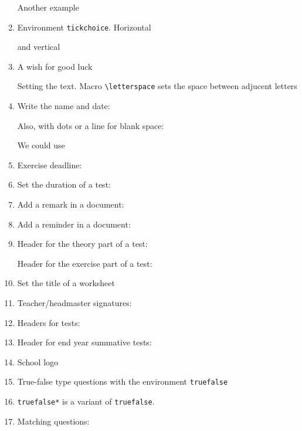 \documentclass[10pt,a4page]{article}
\def\cellwidth{0.4\textwidth}
\newcommand{\miniexample}[2][c]{%
  \parbox[#1]{\cellwidth}{#2}
}
\newcommand{\codeexample}[2][c]{%
  \miniexample[#1]{}
}
\newcommand{\textexample}[2][c]{%
  \small
  \colorbox[gray]{0.9}{\miniexample[#1]{}}
}
\newcommand{\examplerow}[2][10pt]{%
  \par\noindent\phantom{}\hfill\codeexample{#2}\hspace{#1}\textexample{#2}\hfill\phantom{}
}
\begin{document}
\begin{enumerate}
  Another example
  \examplerow{exampleEnvirMultichoice02.tex}
\item Environment \texttt{tickchoice}. Horizontal
  \examplerow{exampleEnvirTickchoice01.tex}

  and vertical

  \examplerow{exampleEnvirTickchoice02.tex}
\item A wish for good luck
  \examplerow{exampleMacroWish01.tex}

  Setting the text. Macro \verb/\letterspace/ sets the space between adjucent letters
    \examplerow{exampleMacroWish02.tex}

  \item Write the name and date:
    \examplerow{exampleMacroNameDate01.tex}

    Also, with dots or a line for blank space:
    \examplerow{exampleMacroNameDate02.tex}

    We could use
    \examplerow{exampleMacroNameDate03.tex}
  \item Exercise deadline:
        \examplerow{exampleMacroDeadline.tex}

      \item Set the duration of a test:
        \examplerow{exampleMacroDuration.tex}

      \item Add a remark in a document:
        \examplerow{exampleMacroRemark.tex}

      \item Add a reminder in a document:
        \examplerow{exampleMacroReminder.tex}

      \item Header for the theory part of a test:
        \examplerow{exampleMacroTheorypart.tex}

        Header for the exercise part of a test:
        \examplerow{exampleMacroExercisepart.tex}

      \item Set the title of a worksheet
        \examplerow{exampleMacroWorksheethd.tex}

      \item Teacher/headmaster signatures:
        \examplerow{exampleMacroSignatures.tex}

      \item Headers for tests:
        \examplerow{exampleMacroExamhd.tex}

      \item Header for end year summative tests:
        \examplerow{exampleMacroFinalExamhd.tex}

      \item School logo
        \examplerow{exampleMacroSchoollogo.tex}

      \item True-false type questions with the environment \verb|truefalse|
        \examplerow{exampleEnvirTruefalse01.tex}

      \item \verb|truefalse*| is a variant of \verb|truefalse|.
        \examplerow{exampleEnvirTruefalse02.tex}

      \item Matching questions:
        \examplerow{exampleMacroMatchingque.tex}
\end{enumerate}
\end{document}
